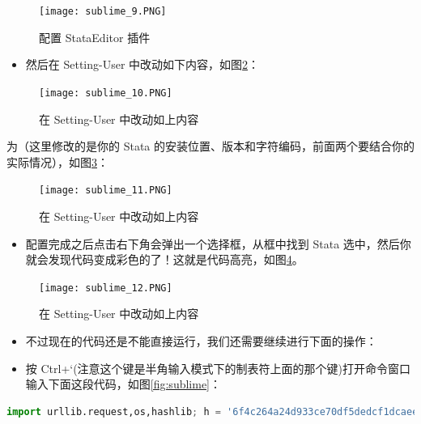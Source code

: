 \documentclass[cn,fancy,blue,11pt]{elegantbook}
\begin{document}
\begin{figure}[htbp]
  \centering
  \texttt{[image: sublime\_9.PNG]}
  \caption{配置 StataEditor 插件}
  \label{fig:sublime_9}
\end{figure}

\begin{itemize}
\item
  然后在 Setting-User 中改动如下内容，如图\ref{fig:sublime_10}：
\end{itemize}

\begin{figure}[htbp]
  \centering
  \texttt{[image: sublime\_10.PNG]}
  \caption{在 Setting-User 中改动如上内容}
  \label{fig:sublime_10}
\end{figure}

为（这里修改的是你的 Stata 的安装位置、版本和字符编码，前面两个要结合你的实际情况），如图\ref{fig:sublime_11}：

\begin{figure}[htbp]
  \centering
  \texttt{[image: sublime\_11.PNG]}
  \caption{在 Setting-User 中改动如上内容}
  \label{fig:sublime_11}
\end{figure}

\begin{itemize}
\item
  配置完成之后点击右下角会弹出一个选择框，从框中找到 Stata 选中，然后你就会发现代码变成彩色的了！这就是代码高亮，如图\ref{fig:sublime_12}。
\end{itemize}

\begin{figure}[htbp]
  \centering
  \texttt{[image: sublime\_12.PNG]}
  \caption{在 Setting-User 中改动如上内容}
  \label{fig:sublime_12}
\end{figure}

\begin{itemize}
\item
  不过现在的代码还是不能直接运行，我们还需要继续进行下面的操作：
\item
  按 Ctrl+`(注意这个键是半角输入模式下的制表符上面的那个键)打开命令窗口输入下面这段代码，如图\ref{fig:sublime}：
\end{itemize}

\begin{lstlisting}[language=Python]
  import urllib.request,os,hashlib; h = '6f4c264a24d933ce70df5dedcf1dcaee' + 'ebe013ee18cced0ef93d5f746d80ef60'; pf = 'Package Control.sublime-package'; ipp = sublime.installed_packages_path(); urllib.request.install_opener( urllib.request.build_opener( urllib.request.ProxyHandler()) ); by = urllib.request.urlopen( 'http://packagecontrol.io/' + pf.replace(' ', '%20')).read(); dh = hashlib.sha256(by).hexdigest(); print('Error validating download (got %s instead of %s), please try manual install' % (dh, h)) if dh != h else open(os.path.join( ipp, pf), 'wb' ).write(by)
\end{lstlisting}
\end{document}
